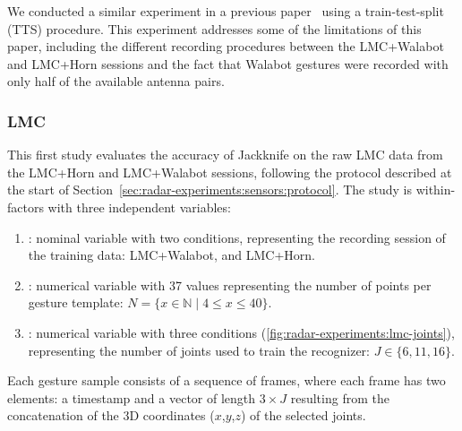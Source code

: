 We conducted a similar experiment in a previous paper~\cite{Sluyters:2022:IUI} using a train-test-split (TTS) procedure. This experiment addresses some of the limitations of this paper, including the different recording procedures between the LMC+Walabot and LMC+Horn sessions and the fact that Walabot gestures were recorded with only half of the available antenna pairs.


\subsubsection{LMC} \label{sec:radar-experiments:sensors:protocol:lmc}
This first study evaluates the accuracy of Jackknife on the raw LMC data from the LMC+Horn and LMC+Walabot sessions, following the protocol described at the start of Section~\ref{sec:radar-experiments:sensors:protocol}. The study is within-factors with three independent variables:
\begin{enumerate}
    \item {}: nominal variable with two conditions, representing the recording session of the training data: LMC+Walabot, and LMC+Horn.
    \item {}: numerical variable with 37 values representing the number of points per gesture template: $N{=}\{x\in\mathbb{N} \mid 4 \leq x \leq 40\}$.
    \item {}: numerical variable with three conditions (\fig \ref{fig:radar-experiments:lmc-joints}), representing the number of joints used to train the recognizer: $J{\in}\{6,11,16\}$. 
\end{enumerate}
Each gesture sample consists of a sequence of frames, where each frame has two elements: a timestamp and a vector of length $3 \times J$ resulting from the concatenation of the 3D coordinates ($x$,$y$,$z$) of the selected joints. 

